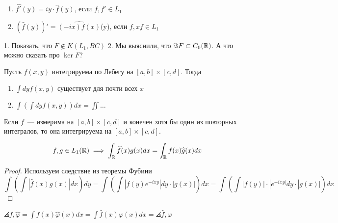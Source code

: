 \begin{theorem}
\begin{enumerate}
    \item $\widehat{f'}(y) = iy \cdot \widehat{f}(y)$, если $f, f' \in L_1$
    \item $(\widehat{f}(y))' = \widehat{(-ix)f(x)}$(y), если $f, xf \in L_1$
\end{enumerate}
\end{theorem}

\begin{exercise}
1. Показать, что $F \not \in K(L_1, BC)$
2. Мы выяснили, что $\Im F \subset C_0(\mathbb{R})$. А что можно сказать про $\ker F$?
\end{exercise}

\begin{theorem}
Пусть $f(x, y)$ интегрируема по Лебегу на $[a, b] \times [c, d]$. Тогда 
\begin{enumerate}
    \item $\int dy f(x, y)$ существует для почти всех $x$
    \item $\int \left( \int dy f(x, y) \right) dx = 
    \iint \ldots$
\end{enumerate}
\end{theorem}

\begin{corollary}
Если $f$~--- измерима на $[a, b] \times [c, d]$ и конечен хотя бы один из повторных интегралов, то она интегрируема на $[a, b] \times [c, d]$.
\end{corollary}

\begin{theorem}
    \[f, g \in L_1(\mathbb{R}) \implies \int_{\mathbb{R}} \widehat{f}(x) g(x) dx = \int_{\mathbb{R}} f(x) \widehat{g}(x) dx
    \]
\end{theorem}
\begin{proof}
Используем следствие из теоремы Фубини
\[
\int \left( \int |\widehat{f}(x) g(x)| dx \right) dy 
 = \int \left( \int |f(y) e^{-ixy}| dy \cdot |g(x)| \right) dx = \int \left( \int |f(y)| \cdot |e^{-ixy|} dy \cdot |g(x)| \right) dx
\]
\end{proof}

\begin{example}
    $\angles{f, \widehat{\varphi}} = \int f(x) \widehat{\varphi}(x)dx = \int \widehat{f}(x) \varphi(x) dx = \angles{\widehat{f}, \varphi}$
\end{example}
